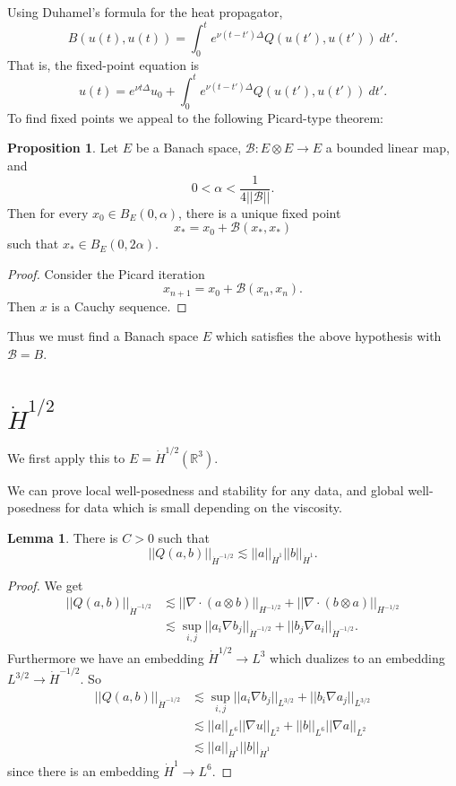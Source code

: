 \documentclass[12pt]{book}
\newcommand{\RR}{\mathbb{R}}
\theoremstyle{definition}
\newtheorem{lemma}[theorem]{Lemma}
\newtheorem{proposition}[theorem]{Proposition}
\begin{document}
Using Duhamel's formula for the heat propagator,
$$B(u(t), u(t)) = \int_0^t e^{\nu(t - t')\Delta}Q(u(t'), u(t')) ~dt'.$$
That is, the fixed-point equation is
$$u(t) = e^{\nu t\Delta} u_0 + \int_0^t e^{\nu(t - t')\Delta}Q(u(t'), u(t')) ~dt'.$$
To find fixed points we appeal to the following Picard-type theorem:

\begin{proposition}
Let $E$ be a Banach space, $\mathscr B: E \otimes E \to E$ a bounded linear map, and
$$0 < \alpha < \frac{1}{4||\mathscr B||}.$$
Then for every $x_0 \in B_E(0, \alpha)$, there is a unique fixed point
$$x_* = x_0 + \mathscr B(x_*, x_*)$$
such that $x_* \in B_E(0, 2\alpha)$.
\end{proposition}
\begin{proof}
Consider the Picard iteration
$$x_{n+1} = x_0 + \mathscr B(x_n, x_n).$$
Then $x$ is a Cauchy sequence.
\end{proof}

Thus we must find a Banach space $E$ which satisfies the above hypothesis with $\mathscr B = B$.

\section{$\dot H^{1/2}$}
We first apply this to $E = \dot H^{1/2}(\RR^3)$.

We can prove local well-posedness and stability for any data, and global well-posedness for data which is small depending on the viscosity.

\begin{lemma}
There is $C > 0$ such that
$$||Q(a, b)||_{\dot H^{-1/2}} \lesssim ||a||_{\dot H^1} ||b||_{\dot H^1}.$$
\end{lemma}
\begin{proof}
We get
\begin{align*}
||Q(a, b)||_{\dot H^{-1/2}} &\lesssim ||\nabla \cdot (a \otimes b)||_{H^{-1/2}} + ||\nabla \cdot(b \otimes a)||_{H^{-1/2}}\\
&\lesssim \sup_{i,j} ||a_i \nabla b_j||_{\dot H^{-1/2}} + ||b_j \nabla a_i||_{\dot H^{-1/2}}.
\end{align*}
Furthermore we have an embedding $\dot H^{1/2} \to L^3$ which dualizes to an embedding $L^{3/2} \to \dot H^{-1/2}$.
So
\begin{align*}
||Q(a, b)||_{\dot H^{-1/2}} &\lesssim \sup_{i,j} ||a_i \nabla b_j||_{L^{3/2}} + ||b_i \nabla a_j||_{L^{3/2}}\\
&\lesssim ||a||_{L^6} ||\nabla u||_{L^2} + ||b||_{L^6} ||\nabla a||_{L^2}\\
&\lesssim ||a||_{\dot H^1} ||b||_{\dot H^1}
\end{align*}
since there is an embedding $\dot H^1 \to L^6$.
\end{proof}
\end{document}
